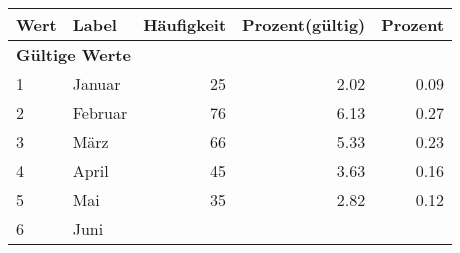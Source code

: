      \begin{longtable}{lXrrr}
     \toprule
     \textbf{Wert} & \textbf{Label} & \textbf{Häufigkeit} & \textbf{Prozent(gültig)} & \textbf{Prozent} \\
     \endhead
     \midrule
     \multicolumn{5}{l}{\textbf{Gültige Werte}}\\

     1 &
     \multicolumn{1}{X}{ Januar   } &


       \num{25} &
       \num[round-mode=places,round-precision=2]{2,02} &
         \num[round-mode=places,round-precision=2]{0,09} \\

     2 &
     \multicolumn{1}{X}{ Februar   } &


       \num{76} &
       \num[round-mode=places,round-precision=2]{6,13} &
         \num[round-mode=places,round-precision=2]{0,27} \\

     3 &
     \multicolumn{1}{X}{ März   } &


       \num{66} &
       \num[round-mode=places,round-precision=2]{5,33} &
         \num[round-mode=places,round-precision=2]{0,23} \\

     4 &
     \multicolumn{1}{X}{ April   } &


       \num{45} &
       \num[round-mode=places,round-precision=2]{3,63} &
         \num[round-mode=places,round-precision=2]{0,16} \\

     5 &
     \multicolumn{1}{X}{ Mai   } &


       \num{35} &
       \num[round-mode=places,round-precision=2]{2,82} &
         \num[round-mode=places,round-precision=2]{0,12} \\

     6 &
     \multicolumn{1}{X}{ Juni   } &



\end{longtable}
